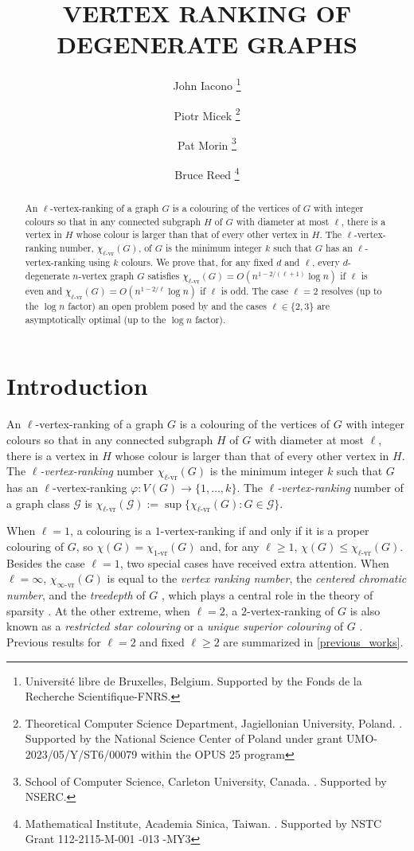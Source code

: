 \documentclass{patmorin}
\title{\MakeUppercase{Vertex Ranking of Degenerate Graphs}}
\author{%
  John Iacono%
    \thanks{Université libre de Bruxelles, Belgium.
Supported by the Fonds de la Recherche Scientifique-FNRS.} \and
  Piotr Micek%
    \thanks{Theoretical Computer Science Department, Jagiellonian University, Poland. \email{piotr.micek@uj.edu.pl}.
    Supported by the National Science Center of Poland
under grant UMO-2023/05/Y/ST6/00079 within the OPUS 25 program
      } \and
  Pat Morin%
    \thanks{School of Computer Science, Carleton University, Canada. \email{morin@scs.carleton.ca}. Supported by NSERC.}\and
  Bruce Reed%
    \thanks{Mathematical Institute, Academia Sinica, Taiwan. \email{bruce.al.reed@gmail.com}.  Supported by  NSTC Grant 112-2115-M-001 -013 -MY3}}
\newcommand{\defin}[1]{\emph{\color{brightmaroon}#1}}
\newcommand{\rn}[1]{\chi_{\operatorname{#1-vr}}}
\newcommand{\lrn}{\rn{\ell}}
\begin{document}
\maketitle

\begin{abstract}
  An $\ell$-vertex-ranking of a graph $G$ is a colouring of the vertices of $G$ with integer colours so that in any connected subgraph $H$ of $G$ with diameter at most $\ell$, there is a vertex in $H$ whose colour is larger than that of every other vertex in $H$.  The $\ell$-vertex-ranking number, $\lrn(G)$, of $G$ is the minimum integer $k$ such that $G$ has an $\ell$-vertex-ranking using $k$ colours.  We prove that, for any fixed $d$ and $\ell$, every $d$-degenerate $n$-vertex graph $G$ satisfies $\lrn(G)= O(n^{1-2/(\ell+1)}\log n)$ if $\ell$ is even and $\lrn(G)= O(n^{1-2/\ell}\log n)$ if $\ell$ is odd. The case $\ell=2$ resolves (up to the $\log n$ factor) an open problem posed by \citet{karpas.neiman.ea:on} and the cases $\ell\in\{2,3\}$ are asymptotically optimal (up to the $\log n$ factor).
\end{abstract}


\section{Introduction}

An $\ell$-vertex-ranking of a graph $G$ is a colouring of the vertices of $G$ with integer colours so that in any connected subgraph $H$ of $G$ with diameter at most $\ell$, there is a vertex in $H$ whose colour is larger than that of every other vertex in $H$.  The \defin{$\ell$-vertex-ranking} number $\lrn(G)$ is the minimum integer $k$ such that $G$ has an $\ell$-vertex-ranking $\varphi:V(G)\to\{1,\ldots,k\}$. The \defin{$\ell$-vertex-ranking} number of a graph class $\mathcal{G}$ is $\lrn(\mathcal{G}):=\sup\{\lrn(G):G\in\mathcal{G}\}$.

When $\ell=1$, a colouring is a $1$-vertex-ranking if and only if it is a proper colouring of $G$, so $\chi(G)=\rn{1}(G)$ and, for any $\ell\ge 1$, $\chi(G)\le \lrn(G)$.  Besides the case $\ell=1$, two special cases have received extra attention.  When $\ell=\infty$, $\rn{\infty}(G)$ is equal to the \defin{vertex ranking number}, the \defin{centered chromatic number}, and the \defin{treedepth} of $G$
\cite{nesetril.ossona:tree-depth},
which plays a central role in the theory of sparsity  \cite{nesetril.ossona:sparsity}.
At the other extreme, when $\ell=2$, a $2$-vertex-ranking of $G$ is also known as a \defin{restricted star colouring} \cite{shalu.antony:complexity} or a \defin{unique superior colouring} of $G$ \cite{karpas.neiman.ea:on}.  Previous results for $\ell=2$ and fixed $\ell\ge 2$ are summarized in \cref{previous_works}.
\end{document}
